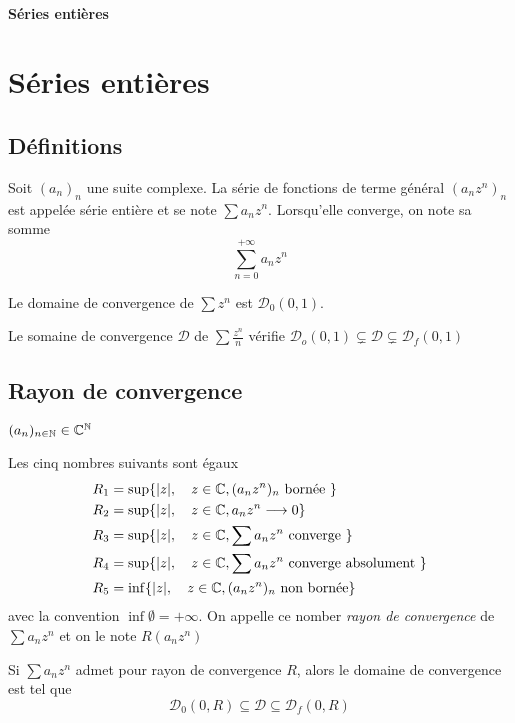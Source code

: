 \ifsolo
    ~

    \vspace{1cm}

    \begin{center}
        \textbf{\LARGE Séries entières} \\[1em]
    \end{center}
    \tableofcontents
\else
    \chapter{Séries entières}

    \minitoc
\fi
\thispagestyle{empty}

\section{Définitions}

\begin{dfn}
    Soit $(a_n)_n$ une suite complexe. La série de fonctions de terme général $(a_nz^n)_n$ est appelée série entière et se note $\sum a_nz^n$. Lorsqu'elle converge, on note sa somme \[
        \sum_{n=0}^{+\infty}a_nz^n
    \]
\end{dfn}

\begin{ex}
    Le domaine de convergence de $\sum z^n$ est $\mathcal D_0(0, 1)$.

    Le somaine de convergence $\mathcal D$ de $\sum \frac{z^n}n$ vérifie $\mathcal D_o(0, 1)\subsetneq\mathcal D\subsetneq \mathcal D_f(0, 1)$
\end{ex}

\section{Rayon de convergence}
\begin{thmdef}
    \Hyp $(a_n)_{n\in\mathbb N}\in\mathbb C^{\mathbb N}$
    \begin{concenum}
    \item Les cinq nombres suivants sont égaux {\begin{align*}
                R_1 &= \sup\{|z|, \quad z\in\mathbb C, (a_nz^n)_n\text{ bornée }\} \\
                R_2 &= \sup\{|z|, \quad z\in\mathbb C, a_nz^n\longrightarrow 0\}\\
                R_3 &= \sup\{|z|, \quad z\in\mathbb C, \sum a_nz^n\text{ converge }\} \\
                R_4 &= \sup\{|z|, \quad z\in\mathbb C, \sum a_nz^n\text{ converge absolument }\} \\
                R_5 &= \inf\{|z|, \quad z\in\mathbb C, (a_nz^n)_n\text{ non bornée}\}
    \end{align*}
avec la convention $\inf\emptyset=+\infty$.}
    On appelle ce nomber \emph{rayon de convergence} de $\sum a_nz^n$ et on le note $R(a_nz^n)$
\item Si $\sum a_nz^n$ admet pour rayon de convergence $R$, alors le domaine de convergence est tel que \[
        \mathcal D_0(0, R)\subseteq \mathcal D\subseteq \mathcal D_f(0, R)
    \]
    \end{concenum}
\end{thmdef}


